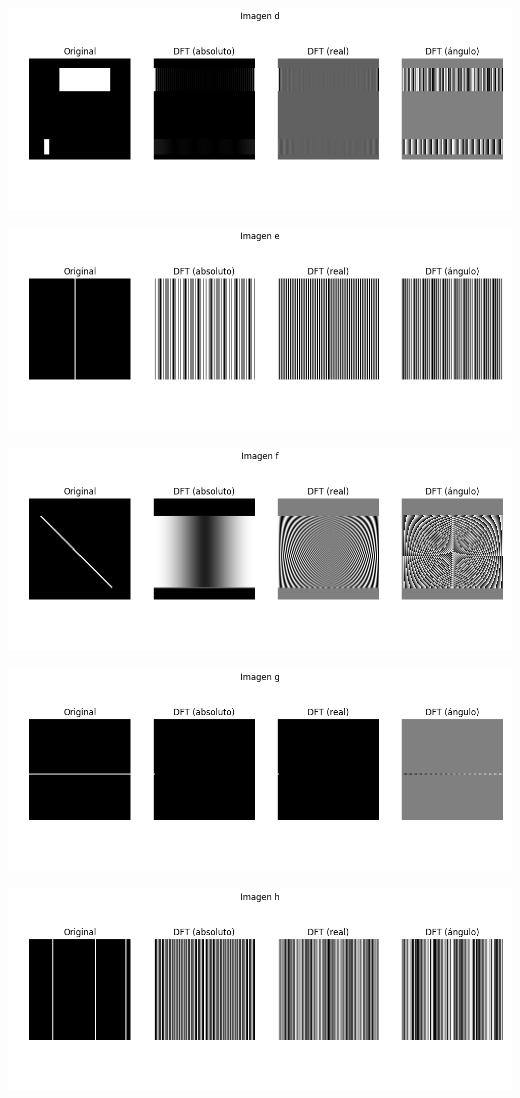 \documentclass[a4paper]{article}
\begin{document}
\includegraphics[scale=0.5]{imgs/3-d.png}

\includegraphics[scale=0.5]{imgs/3-e.png}

\includegraphics[scale=0.5]{imgs/3-f.png}

\includegraphics[scale=0.5]{imgs/3-g.png}

\includegraphics[scale=0.5]{imgs/3-h.png}
\end{document}
